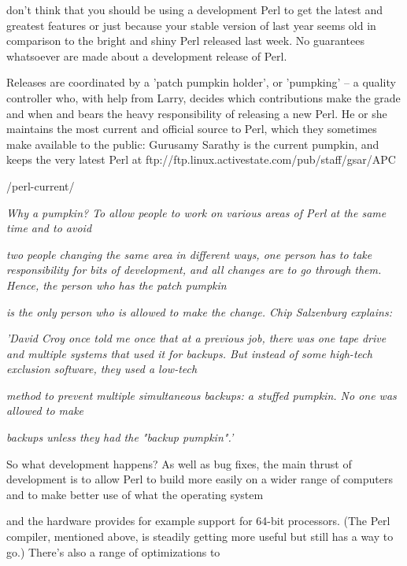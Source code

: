 \documentclass[a4paper,11pt]{book}
\begin{document}
\noindent don't think that you should be using a development Perl to get the latest and greatest features or just because your stable version of last year seems old in comparison to the bright and shiny Perl released last week. No guarantees whatsoever are made about a development release of Perl.

\noindent 

\noindent Releases are coordinated by a 'patch pumpkin holder', or 'pumpking' -- a quality controller who, with help from Larry, decides which contributions make the grade and when and bears the heavy responsibility of releasing a new Perl. He or she maintains the most current and official source to Perl, which they sometimes make available to the public: Gurusamy Sarathy is the current pumpkin, and keeps the very latest Perl at ftp://ftp.linux.activestate.com/pub/staff/gsar/APC

\noindent /perl-current/

\noindent 

\noindent \textit{Why a pumpkin? To allow people to work on various areas of Perl at the same time and to avoid}

\noindent \textit{two people changing the same area in different ways, one person has to take responsibility for bits of development, and all changes are to go through them. Hence, the person who has the patch pumpkin}

\noindent \textit{is the only person who is allowed to make the change. Chip Salzenburg explains:}

\noindent \textit{'David Croy once told me once that at a previous job, there was one tape drive and multiple systems that used it for backups. But instead of some high-tech exclusion software, they used a low-tech}

\noindent \textit{method to prevent multiple simultaneous backups: a stuffed pumpkin. No one was allowed to make}

\noindent \textit{backups unless they had the "backup pumpkin".'}

\noindent 

\noindent So what development happens? As well as bug fixes, the main thrust of development is to allow Perl to build more easily on a wider range of computers and to make better use of what the operating system

\noindent and the hardware provides for example support for 64-bit processors. (The Perl compiler, mentioned above, is steadily getting more useful but still has a way to go.) There's also a range of optimizations to
\end{document}
